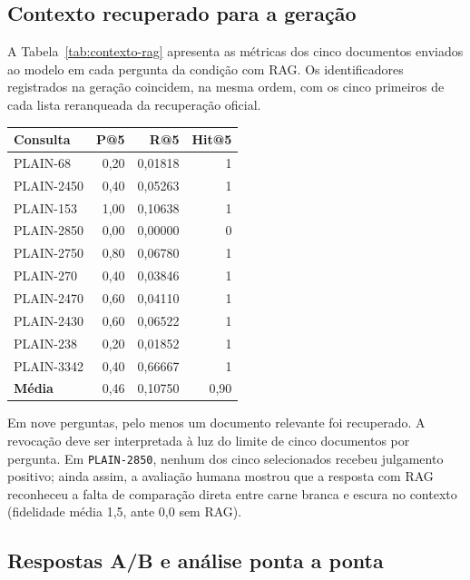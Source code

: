 \documentclass[12pt]{article}
\begin{document}
\subsection{Contexto recuperado para a geração}

A Tabela~\ref{tab:contexto-rag} apresenta as métricas dos cinco documentos
enviados ao modelo em cada pergunta da condição com RAG. Os identificadores
registrados na geração coincidem, na mesma ordem, com os cinco primeiros
de cada lista reranqueada da recuperação oficial.

\noindent\begin{minipage}{\linewidth}
\centering
\small
{}
\label{tab:contexto-rag}
\begin{tabular}{@{}lrrr@{}}
\toprule
Consulta & P@5 & R@5 & Hit@5 \\
\midrule
PLAIN-68 & 0,20 & 0,01818 & 1 \\
PLAIN-2450 & 0,40 & 0,05263 & 1 \\
PLAIN-153 & 1,00 & 0,10638 & 1 \\
PLAIN-2850 & 0,00 & 0,00000 & 0 \\
PLAIN-2750 & 0,80 & 0,06780 & 1 \\
PLAIN-270 & 0,40 & 0,03846 & 1 \\
PLAIN-2470 & 0,60 & 0,04110 & 1 \\
PLAIN-2430 & 0,60 & 0,06522 & 1 \\
PLAIN-238 & 0,20 & 0,01852 & 1 \\
PLAIN-3342 & 0,40 & 0,66667 & 1 \\
\midrule
\textbf{Média} & 0,46 & 0,10750 & 0,90 \\
\bottomrule
\end{tabular}
\end{minipage}
\par\medskip

Em nove perguntas, pelo menos um documento relevante foi recuperado.
A revocação deve ser interpretada à luz do limite de cinco documentos
por pergunta. Em \texttt{PLAIN-2850}, nenhum dos cinco selecionados
recebeu julgamento positivo; ainda assim, a avaliação humana mostrou que
a resposta com RAG reconheceu a falta de comparação direta entre carne
branca e escura no contexto (fidelidade média 1,5, ante 0,0 sem RAG).

\subsection{Respostas A/B e análise ponta a ponta}
\end{document}

